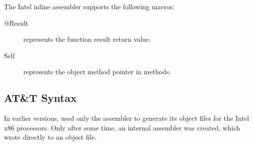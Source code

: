 The Intel inline assembler supports the following macros:
\begin{description}
\item [@Result] represents the function result return value.
\item [Self] represents the object method pointer in methods.
\end{description}

\subsection{AT\&T Syntax}
\label{se:AttSyntax}
In earlier versions, \fpc used only the \gnu {} assembler to generate 
its object files for the Intel x86 processors. Only after some time, an
internal assembler was created, which wrote directly to an object file.


